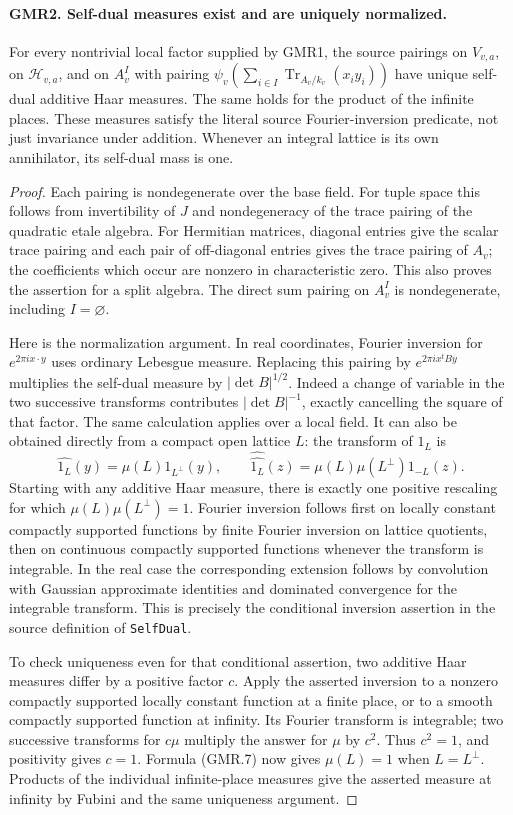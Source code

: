 \paragraph{GMR2. Self-dual measures exist and are uniquely normalized.}
\label{claim:GMR2}
For every nontrivial local factor supplied by GMR1, the source pairings
on $V_{v,a}$, on $\mathcal H_{v,a}$, and on $A_v^I$ with pairing
$\psi_v(\sum_{i\in I}\operatorname{Tr}_{A_v/k_v}(x_i y_i))$
have unique self-dual additive Haar measures.  The same holds for the
product of the infinite places.  These measures satisfy the literal
source Fourier-inversion predicate, not just invariance under addition.
Whenever an integral lattice is its own annihilator, its self-dual mass
is one.

\begin{proof}
Each pairing is nondegenerate over the base field.  For tuple space
this follows from invertibility of $J$ and nondegeneracy of the trace
pairing of the quadratic etale algebra.  For Hermitian matrices,
diagonal entries give the scalar trace pairing and each pair of
off-diagonal entries gives the trace pairing of $A_v$; the coefficients
which occur are nonzero in characteristic zero.  This also proves the
assertion for a split algebra.  The direct sum pairing on $A_v^I$ is
nondegenerate, including $I=\varnothing$.

Here is the normalization argument.  In real coordinates, Fourier
inversion for $e^{2\pi i x\cdot y}$ uses ordinary Lebesgue measure.
Replacing this pairing by $e^{2\pi i x^tBy}$ multiplies the self-dual
measure by $|\det B|^{1/2}$.  Indeed a change of variable in the two
successive transforms contributes $|\det B|^{-1}$, exactly cancelling
the square of that factor.  The same calculation applies over a local
field.  It can also be obtained directly from a compact open lattice
$L$: the transform of $1_L$ is
\[
 \widehat{1_L}(y)=\mu(L)1_{L^\perp}(y),\qquad
 \widehat{\widehat{1_L}}(z)=\mu(L)\mu(L^\perp)1_{-L}(z).
 \tag{GMR.7}
\]
Starting with any additive Haar measure, there is exactly one positive
rescaling for which $\mu(L)\mu(L^\perp)=1$.  Fourier inversion follows
first on locally constant compactly supported functions by finite
Fourier inversion on lattice quotients, then on continuous compactly
supported functions whenever the transform is integrable.  In the real
case the corresponding extension follows by convolution with Gaussian
approximate identities and dominated convergence for the integrable
transform.  This is precisely the conditional inversion assertion in
the source definition of \texttt{SelfDual}.

To check uniqueness even for that conditional assertion, two additive
Haar measures differ by a positive factor $c$.  Apply the asserted
inversion to a nonzero compactly supported locally constant function
at a finite place, or to a smooth compactly supported function at
infinity.  Its Fourier transform is integrable; two successive
transforms for $c\mu$ multiply the answer for $\mu$ by $c^2$.
Thus $c^2=1$, and positivity gives $c=1$.  Formula (GMR.7) now gives
$\mu(L)=1$ when $L=L^\perp$.  Products of the individual infinite-place
measures give the asserted measure at infinity by Fubini and the same
uniqueness argument.
\end{proof}
